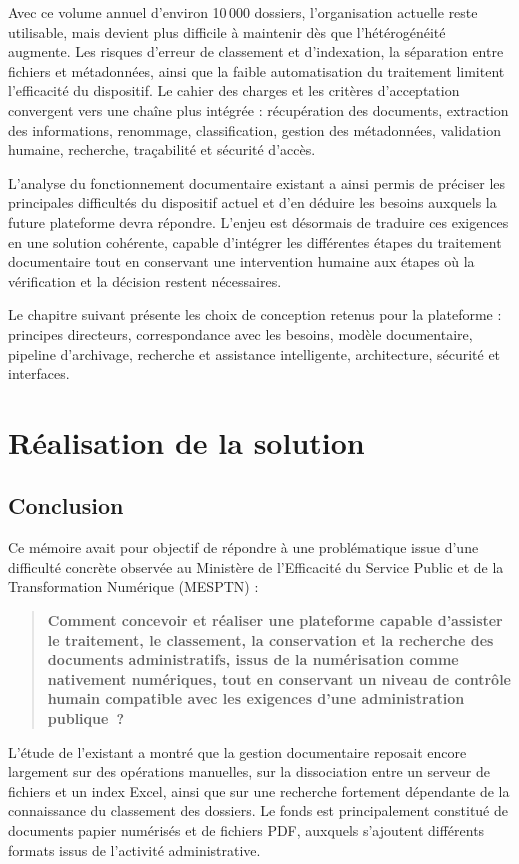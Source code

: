 \documentclass[12pt,a4paper]{report}
\newcommand{\nomMinistere}{Ministère de l'Efficacité du Service Public et de la Transformation Numérique (MESPTN)}
\newcommand{\problematiqueMemoire}{Comment concevoir et réaliser une plateforme capable d'assister le traitement, le classement, la conservation et la recherche des documents administratifs, issus de la numérisation comme nativement numériques, tout en conservant un niveau de contrôle humain compatible avec les exigences d'une administration publique~?}
\begin{document}
Avec ce volume annuel d'environ 10\,000 dossiers, l'organisation actuelle reste utilisable, mais devient plus difficile à maintenir dès que l'hétérogénéité augmente. Les risques d'erreur de classement et d'indexation, la séparation entre fichiers et métadonnées, ainsi que la faible automatisation du traitement limitent l'efficacité du dispositif. Le cahier des charges et les critères d'acceptation convergent vers une chaîne plus intégrée : récupération des documents, extraction des informations, renommage, classification, gestion des métadonnées, validation humaine, recherche, traçabilité et sécurité d'accès.

L'analyse du fonctionnement documentaire existant a ainsi permis de préciser les principales difficultés du dispositif actuel et d'en déduire les besoins auxquels la future plateforme devra répondre. L'enjeu est désormais de traduire ces exigences en une solution cohérente, capable d'intégrer les différentes étapes du traitement documentaire tout en conservant une intervention humaine aux étapes où la vérification et la décision restent nécessaires.

Le chapitre suivant présente les choix de conception retenus pour la plateforme : principes directeurs, correspondance avec les besoins, modèle documentaire, pipeline d'archivage, recherche et assistance intelligente, architecture, sécurité et interfaces.



\part{Réalisation de la solution}
\thispagestyle{plain}





\chapter*{Conclusion}

Ce mémoire avait pour objectif de répondre à une problématique issue d'une difficulté concrète observée au \nomMinistere{} :

\begin{quote}
\textbf{\problematiqueMemoire}
\end{quote}

L'étude de l'existant a montré que la gestion documentaire reposait encore largement sur des opérations manuelles, sur la dissociation entre un serveur de fichiers et un index Excel, ainsi que sur une recherche fortement dépendante de la connaissance du classement des dossiers. Le fonds est principalement constitué de documents papier numérisés et de fichiers PDF, auxquels s'ajoutent différents formats issus de l'activité administrative.
\end{document}
